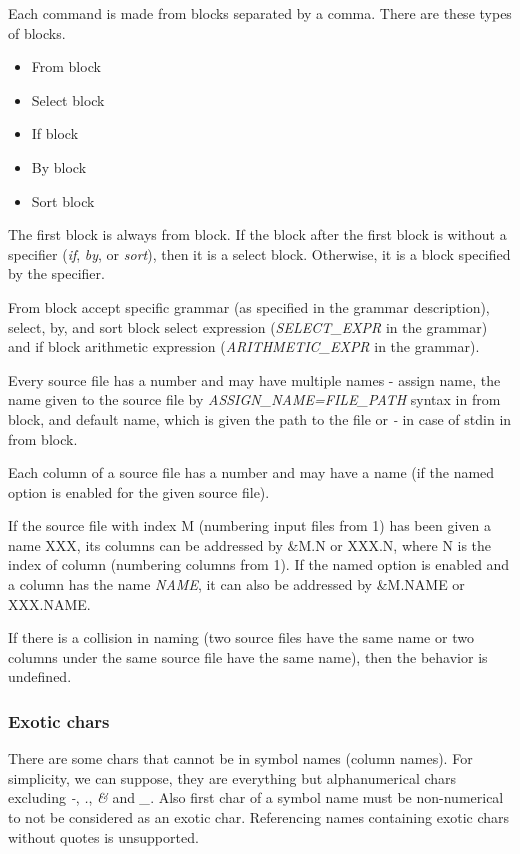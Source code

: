 Each command is made from blocks separated by a comma. There are these types of blocks.
\begin{itemize}
    \item From block
    \item Select block
    \item If block
    \item By block
    \item Sort block
\end{itemize}

The first block is always from block. If the block after the first block is without a specifier (\textit{if}, \textit{by}, or \textit{sort}), then it is a select block. Otherwise, it is a block specified by the specifier.

From block accept specific grammar (as specified in the grammar description), select, by, and sort block select expression (\textit{SELECT\_EXPR} in the grammar) and if block arithmetic expression (\textit{ARITHMETIC\_EXPR} in the grammar).

Every source file has a number and may have multiple names - assign name, the name given to the source file by \textit{ASSIGN\_NAME=FILE\_PATH} syntax in from block, and  
default name, which is given the path to the file or \textit{-} in case of stdin in from block.

Each column of a source file has a number and may have a name (if the named option is enabled for the given source file).

If the source file with index M (numbering input files from 1) has been given a name XXX, its columns can be addressed by \&M.N or XXX.N, where N is the index of column (numbering columns from 1).  
If the named option is enabled and a column has the name \textit{NAME}, it can also be addressed by \&M.NAME or XXX.NAME.

If there is a collision in naming (two source files have the same name or two columns under the same source file have the same name), then the behavior is undefined.

\subsubsection{Exotic chars}
There are some chars that cannot be in symbol names (column names). For simplicity, we can suppose, they are everything but alphanumerical chars excluding \textit{-}, \textit{.}, \textit{\&} and \textit{\_}.  
Also first char of a symbol name must be non-numerical to not be considered as an exotic char.
Referencing names containing exotic chars without quotes is unsupported.

